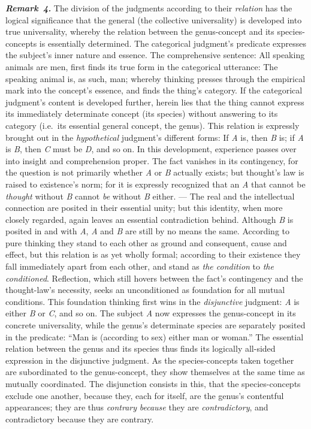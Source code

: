 \documentclass[12pt]{book}
\newcommand{\anm}[1]{\emph{\textbf{Remark~#1.}}}
\begin{document}
\anm{4} The division of the judgments according to their \emph{relation} has
the logical significance that the general (the collective universality) is
developed into true universality, whereby the relation between the
genus-concept and its species-concepts is essentially determined. The
categorical judgment's predicate expresses the subject's inner nature and
essence. The comprehensive sentence: All speaking animals are men, first
finds its true form in the categorical utterance: The speaking animal is, as
such, man; whereby thinking presses through the empirical mark into the
concept's essence, and finds the thing's category. If the categorical
judgment's content is developed further, herein lies that the thing cannot
express its immediately determinate concept (its species) without answering
to its category (i.e.\ its essential general concept, the genus). This
relation is expressly brought out in the \emph{hypothetical} judgment's
different forms: If \textit{A} is, then \textit{B} is; if \textit{A} is
\textit{B}, then \textit{C} must be \textit{D}, and so on. In this
development, experience passes over into insight and comprehension proper.
The fact vanishes in its contingency, for the question is not primarily
whether \textit{A} or \textit{B} actually exists; but thought's law is
raised to existence's norm; for it is expressly recognized that an
\textit{A} that cannot be \emph{thought} without \textit{B} cannot
\emph{be} without \textit{B} either. --- The real and the intellectual
connection are posited in their essential unity; but this identity, when
more closely regarded, again leaves an essential contradiction behind.
Although \textit{B} is posited in and with \textit{A}, \textit{A} and
\textit{B} are still by no means the same. According to pure thinking they
stand to each other as ground and consequent, cause and effect, but this
relation is as yet wholly formal; according to their existence they fall
immediately apart from each other, and stand as \emph{the condition} to
\emph{the conditioned}. Reflection, which still hovers between the fact's
contingency and the thought-law's necessity, seeks an unconditioned as
foundation for all mutual conditions. This foundation thinking first wins in
the \emph{disjunctive} judgment: \textit{A} is either \textit{B} or
\textit{C}, and so on. The subject \textit{A} now expresses the
genus-concept in its concrete universality, while the genus's determinate
species are separately posited in the predicate: ``Man is (according to sex)
either man or woman.'' The essential relation between the genus and its
species thus finds its logically all-sided expression in the disjunctive
judgment. As the species-concepts taken together are subordinated to the
genus-concept, they show themselves at the same time as mutually
coordinated. The disjunction consists in this, that the species-concepts
exclude one another, because they, each for itself, are the genus's
contentful appearances; they are thus \emph{contrary} \emph{because} they
are \emph{contradictory}, and contradictory because they are contrary.
\end{document}
